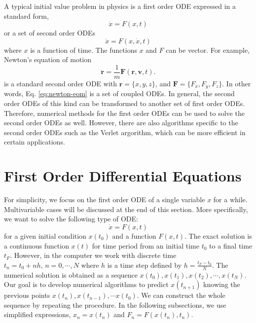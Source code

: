 A typical initial value problem in physics is a first order ODE expressed in a standard form,
\begin{equation}
\dot{x} = F(x,t) 
\label{eq:ode1st}
\end{equation}
or a set of second order ODEs
\begin{equation}
\ddot{x} = F(x,\dot{x},t)
\end{equation}
where $x$ is a function of time.
The functions $x$ and $F$ can be vector. For example, Newton's equation of motion 
\begin{equation}\label{eq:newton-eom}
\ddot{\mathbf{r}} = \frac{1}{m} \mathbf{F}(\mathbf{r},\mathbf{v},t).
\end{equation}
is a standard second order ODE with $\mathbf{r}=\{x,y,z\}$, and $\mathbf{F}=\{F_x,F_y,F_z\}$.  In other words, Eq. \eqref{eq:newton-eom} is a set of coupled ODEs.
In general, the second order ODEs of this kind can be transformed to another set of first order ODEs. Therefore, numerical methods for the first order ODEs can be used to solve the second order ODEs as well.  However, there are also algorithms specific to the second order ODEs such as the Verlet argorithm, which can be more efficient in certain applications.

\section{First Order Differential Equations}
 
For simplicity, we focus on the first order ODE of a single variable $x$ for a while. Multivariable cases will be discussed at the end of this section. More specifically, we want to solve the following type of ODE:
\begin{equation}\label{eq:ode-1d}
\dot{x} = F(x,t)
\end{equation}
for a given initial condition $x(t_0)$ and a function $F(x,t)$.  The exact solution is a continuous function $x(t)$ for time period from an initial time $t_0$ to a final time $t_F$.  However, in the computer we work with discrete time $t_n = t_0 + n h,\, n=0, \cdots, N$ where $h$ is a time step defined by $h=\displaystyle\frac{t_F-t_0}{N}$.  The numerical solution is obtained as a sequence $x(t_0), x(t_1), x(t_2), \cdots, x(t_N)$.  Our goal is to develop numerical algorithms to predict $x(t_{n+1})$  knowing the previous points $x(t_n), x(t_{n-1}), \cdots x(t_0)$. We can construct the whole sequence by repeating the procedure. In the following subsections, we use simplified expressions, $x_n=x(t_n)$ and $F_n = F(x(t_n),t_n)$. 

